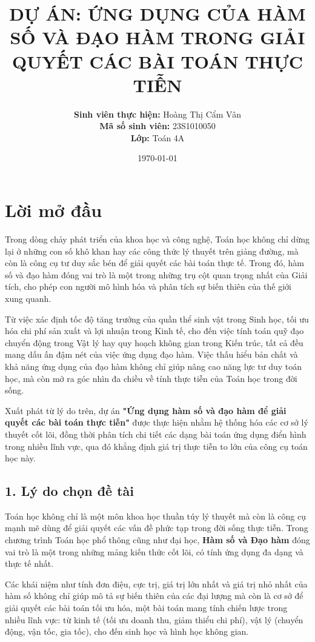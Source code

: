 \documentclass[12pt,a4paper]{article}
\title{\LARGE \textbf{DỰ ÁN: ỨNG DỤNG CỦA HÀM SỐ VÀ ĐẠO HÀM TRONG GIẢI QUYẾT CÁC BÀI TOÁN THỰC TIỄN}}
\author{\textbf{Sinh viên thực hiện:} Hoàng Thị Cẩm Vân\\ 
\textbf{Mã số sinh viên:} 23S1010050 \\ 
\textbf{Lớp:} Toán 4A }
\date{\today}
\begin{document}
\maketitle
\thispagestyle{empty}
\newpage

\tableofcontents
\newpage


\section*{Lời mở đầu}

Trong dòng chảy phát triển của khoa học và công nghệ, Toán học không chỉ dừng lại ở những con số khô khan hay các công thức lý thuyết trên giảng đường, mà còn là công cụ tư duy sắc bén để giải quyết các bài toán thực tế. Trong đó, hàm số và đạo hàm đóng vai trò là một trong những trụ cột quan trọng nhất của Giải tích, cho phép con người mô hình hóa và phân tích sự biến thiên của thế giới xung quanh.

Từ việc xác định tốc độ tăng trưởng của quần thể sinh vật trong Sinh học, tối ưu hóa chi phí sản xuất và lợi nhuận trong Kinh tế, cho đến việc tính toán quỹ đạo chuyển động trong Vật lý hay quy hoạch không gian trong Kiến trúc, tất cả đều mang dấu ấn đậm nét của việc ứng dụng đạo hàm. Việc thấu hiểu bản chất và khả năng ứng dụng của đạo hàm không chỉ giúp nâng cao năng lực tư duy toán học, mà còn mở ra góc nhìn đa chiều về tính thực tiễn của Toán học trong đời sống.

Xuất phát từ lý do trên, dự án \textbf{"Ứng dụng hàm số và đạo hàm để giải quyết các bài toán thực tiễn"} được thực hiện nhằm hệ thống hóa các cơ sở lý thuyết cốt lõi, đồng thời phân tích chi tiết các dạng bài toán ứng dụng điển hình trong nhiều lĩnh vực, qua đó khẳng định giá trị thực tiễn to lớn của công cụ toán học này.

\subsection*{1. Lý do chọn đề tài}
Toán học không chỉ là một môn khoa học thuần túy lý thuyết mà còn là công cụ mạnh mẽ dùng để giải quyết các vấn đề phức tạp trong đời sống thực tiễn. Trong chương trình Toán học phổ thông cũng như đại học, \textbf{Hàm số và Đạo hàm} đóng vai trò là một trong những mảng kiến thức cốt lõi, có tính ứng dụng đa dạng và thực tế nhất. 

Các khái niệm như tính đơn điệu, cực trị, giá trị lớn nhất và giá trị nhỏ nhất của hàm số không chỉ giúp mô tả sự biến thiên của các đại lượng mà còn là cơ sở để giải quyết các bài toán tối ưu hóa, một bài toán mang tính chiến lược trong nhiều lĩnh vực: từ kinh tế (tối ưu doanh thu, giảm thiểu chi phí), vật lý (chuyển động, vận tốc, gia tốc), cho đến sinh học và hình học không gian.
\end{document}

